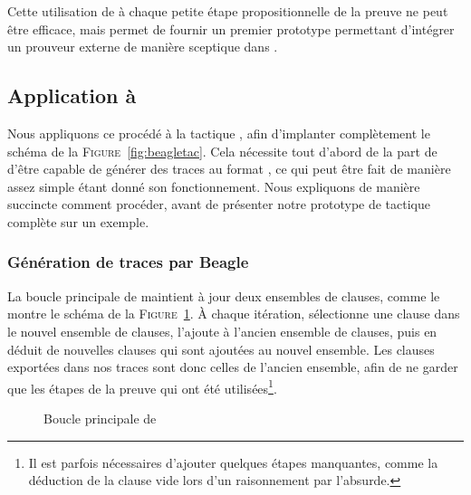 Cette utilisation de \metistac à chaque petite étape propositionnelle de
la preuve ne peut être efficace, mais permet de fournir un premier
prototype permettant d'intégrer un prouveur externe de manière sceptique
dans \holfour.


\subsection{Application à \beagle}

Nous appliquons ce procédé à la tactique \beagletac, afin d'implanter
complètement le schéma de la \textsc{Figure}~\ref{fig:beagletac}. Cela
nécessite tout d'abord de la part de \beagle d'être capable de générer
des traces au format \tff, ce qui peut être fait de manière assez simple
étant donné son fonctionnement. Nous expliquons de manière succincte
comment procéder, avant de présenter notre prototype de tactique
\beagletac complète sur un exemple.


\subsubsection{Génération de traces par Beagle}
La boucle principale de \beagle maintient à jour deux ensembles de
clauses, comme le montre le schéma de la
\textsc{Figure}~\ref{fig:fonctionnement_beagle}. À chaque itération,
\beagle sélectionne une clause dans le nouvel ensemble de clauses,
l'ajoute à l'ancien ensemble de clauses, puis en déduit de nouvelles
clauses qui sont ajoutées au nouvel ensemble. Les clauses exportées dans
nos traces sont donc celles de l'ancien ensemble, afin de ne garder que
les étapes de la preuve qui ont été utilisées\footnote{Il est parfois
  nécessaires d'ajouter quelques étapes manquantes, comme la déduction
  de la clause vide lors d'un raisonnement par l'absurde.}.

\begin{figure}
\begin{center}
\caption{Boucle principale de \beagle}
\label{fig:fonctionnement_beagle}
\end{center}
\end{figure}

